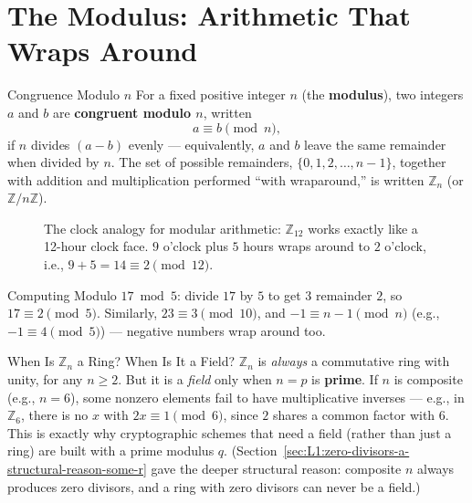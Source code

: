 \section{The Modulus: Arithmetic That Wraps Around}
\label{sec:L1:the-modulus-arithmetic-that-wraps-around}

\begin{defbox}{Congruence Modulo $n$}
For a fixed positive integer $n$ (the \textbf{modulus}), two integers $a$ and $b$ are \textbf{congruent modulo $n$}, written
$$a \equiv b \pmod{n},$$
if $n$ divides $(a-b)$ evenly --- equivalently, $a$ and $b$ leave the same remainder when divided by $n$. The set of possible remainders, $\{0, 1, 2, \ldots, n-1\}$, together with addition and multiplication performed ``with wraparound,'' is written $\mathbb{Z}_n$ (or $\mathbb{Z}/n\mathbb{Z}$).
\end{defbox}

\begin{figure}[ht]
\centering
{}
\caption{The clock analogy for modular arithmetic: $\mathbb{Z}_{12}$ works exactly like a 12-hour clock face. $9$ o'clock plus $5$ hours wraps around to $2$ o'clock, i.e., $9+5=14 \equiv 2 \pmod{12}$.}
\label{fig:clock}
\end{figure}

\begin{exbox}{Computing Modulo}
$17 \bmod 5$: divide $17$ by $5$ to get $3$ remainder $2$, so $17 \equiv 2 \pmod 5$. Similarly, $23 \equiv 3 \pmod{10}$, and $-1 \equiv n-1 \pmod n$ (e.g., $-1 \equiv 4 \pmod 5$) --- negative numbers wrap around too.
\end{exbox}

\begin{rmkbox}{When Is $\mathbb{Z}_n$ a Ring? When Is It a Field?}
$\mathbb{Z}_n$ is \emph{always} a commutative ring with unity, for any $n \geq 2$. But it is a \emph{field} only when $n = p$ is \textbf{prime}. If $n$ is composite (e.g., $n=6$), some nonzero elements fail to have multiplicative inverses --- e.g., in $\mathbb{Z}_6$, there is no $x$ with $2x \equiv 1 \pmod 6$, since $2$ shares a common factor with $6$. This is exactly why cryptographic schemes that need a field (rather than just a ring) are built with a prime modulus $q$. (Section~\ref{sec:L1:zero-divisors-a-structural-reason-some-r} gave the deeper structural reason: composite $n$ always produces zero divisors, and a ring with zero divisors can never be a field.)
\end{rmkbox}

